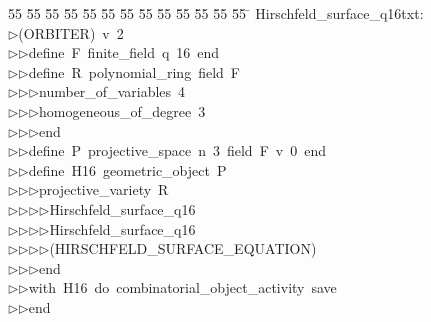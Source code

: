 %
%
\begin{tabbing}
55 \= 55 \= 55 \= 55 \= 55 \= 55 \= 55 \= 55 \= 55 \= 55 \= 55 \= 55 \= 55 \= \kill
Hirschfeld\_surface\_q16txt:\\[0pt]
$\triangleright$\>(ORBITER)\ v\ 2\ \\[0pt]
$\triangleright$\>$\triangleright$\>define\ F\ finite\_field\ q\ 16\ end\ \\[0pt]
$\triangleright$\>$\triangleright$\>define\ R\ polynomial\_ring\ field\ F\ \\[0pt]
$\triangleright$\>$\triangleright$\>$\triangleright$\>number\_of\_variables\ 4\ \\[0pt]
$\triangleright$\>$\triangleright$\>$\triangleright$\>homogeneous\_of\_degree\ 3\ \\[0pt]
$\triangleright$\>$\triangleright$\>$\triangleright$\>end\ \\[0pt]
$\triangleright$\>$\triangleright$\>define\ P\ projective\_space\ n\ 3\ field\ F\ v\ 0\ end\ \\[0pt]
$\triangleright$\>$\triangleright$\>define\ H16\ geometric\_object\ P\ \\[0pt]
$\triangleright$\>$\triangleright$\>$\triangleright$\>projective\_variety\ R\ \\[0pt]
$\triangleright$\>$\triangleright$\>$\triangleright$\>$\triangleright$\>Hirschfeld\_surface\_q16\ \\[0pt]
$\triangleright$\>$\triangleright$\>$\triangleright$\>$\triangleright$\>Hirschfeld\_surface\_q16\ \\[0pt]
$\triangleright$\>$\triangleright$\>$\triangleright$\>$\triangleright$\>(HIRSCHFELD\_SURFACE\_EQUATION)\ \\[0pt]
$\triangleright$\>$\triangleright$\>$\triangleright$\>end\ \\[0pt]
$\triangleright$\>$\triangleright$\>with\ H16\ do\ combinatorial\_object\_activity\ save\ \\[0pt]
$\triangleright$\>$\triangleright$\>end\\[0pt]
\end{tabbing}

